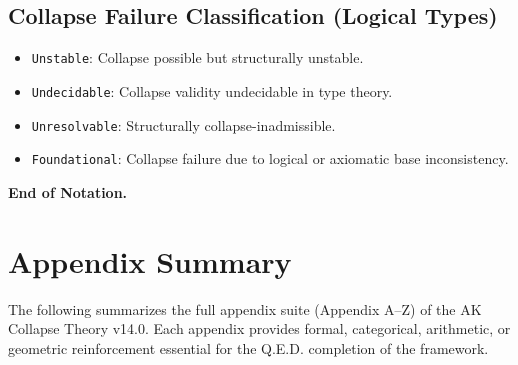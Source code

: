 \documentclass[11pt]{article}
\begin{document}
\subsection*{Collapse Failure Classification (Logical Types)}

\begin{itemize}
  \item \texttt{Unstable}: Collapse possible but structurally unstable.
  \item \texttt{Undecidable}: Collapse validity undecidable in type theory.
  \item \texttt{Unresolvable}: Structurally collapse-inadmissible.
  \item \texttt{Foundational}: Collapse failure due to logical or axiomatic base inconsistency.
\end{itemize}

\vspace{1em}
\textbf{End of Notation.}




\section*{Appendix Summary}

The following summarizes the full appendix suite (Appendix A–Z) of the AK Collapse Theory v14.0. Each appendix provides formal, categorical, arithmetic, or geometric reinforcement essential for the Q.E.D. completion of the framework.
\end{document}
